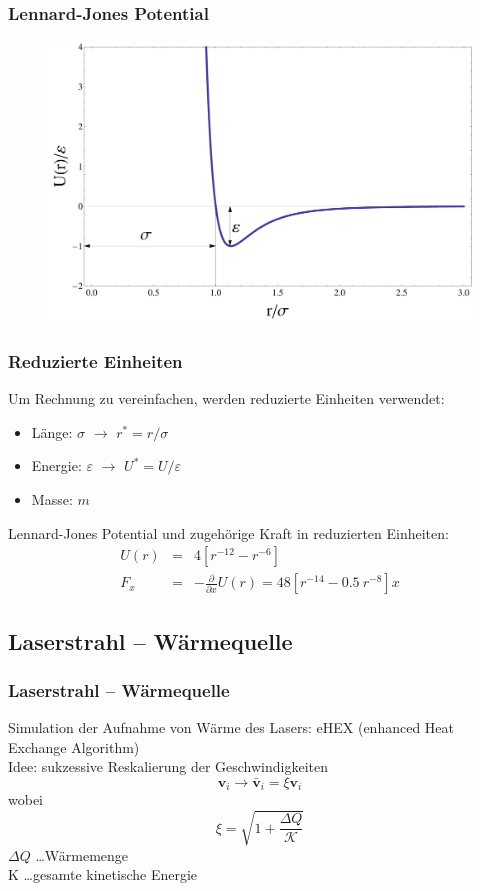 \documentclass[handout]{beamer}
\begin{document}
\begin{frame}
\frametitle{Lennard-Jones Potential}
\begin{center}
\begin{figure}
\includegraphics[scale=0.3]{../images/LJ-2.pdf}
\end{figure}
\end{center}
\end{frame}

\begin{frame}
\frametitle{Reduzierte Einheiten}
Um Rechnung zu vereinfachen, werden reduzierte Einheiten verwendet:
\begin{itemize}
\item Länge: $\sigma$ $\rightarrow$ $r^* = r/\sigma$
\item Energie: $\varepsilon$ $\rightarrow$ $U^* = U/\varepsilon$
\item Masse: $m$
\end{itemize}
Lennard-Jones Potential und zugehörige Kraft in reduzierten Einheiten:
\begin{eqnarray}
    U(r) &=& 4\left[{r}^{-12} - {r}^{-6}\right] \\
    F_{x} &=& -\frac{\partial}{\partial x} U(r) = 48 \left[r^{-14} - 0.5 \ r^{-8}\right] x
\end{eqnarray}
\end{frame}



\subsection{Laserstrahl -- Wärmequelle}
\begin{frame}
\frametitle{Laserstrahl -- Wärmequelle}
Simulation der Aufnahme von Wärme des Lasers: eHEX (enhanced Heat Exchange Algorithm)\\
Idee: sukzessive Reskalierung der Geschwindigkeiten 
\begin{equation}
    \mathbf{v}_i \rightarrow \mathbf{\bar{v}}_i = \xi \mathbf{v}_i
\end{equation}
wobei 
\begin{equation}
    \xi = \sqrt{1+\frac{\Delta Q}{\mathcal{K}}}
\end{equation}
$\Delta Q$ \ldots Wärmemenge\\
K \ldots gesamte kinetische Energie

\end{frame}
\end{document}
